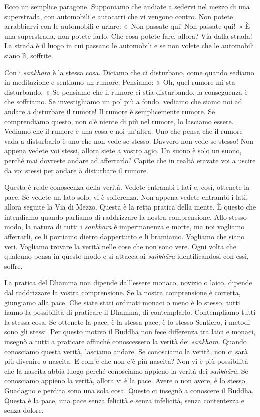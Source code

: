 Ecco un semplice paragone. Supponiamo che andiate a sedervi nel mezzo di
una superstrada, con automobili e autocarri che vi vengono contro. Non
potete arrabbiarvi con le automobili e urlare: «~Non passate qui! Non
passate qui!~» È una superstrada, non potete farlo. Che cosa potete
fare, allora? Via dalla strada! La strada è il luogo in cui passano le
automobili e se non volete che le automobili siano lì, soffrite.

Con i \emph{saṅkhāra} è la stessa cosa. Diciamo che ci disturbano, come
quando sediamo in meditazione e sentiamo un rumore. Pensiamo: «~Oh, quel
rumore mi sta disturbando.~» Se pensiamo che il rumore ci stia
disturbando, la conseguenza è che soffriamo. Se investighiamo un po' più
a fondo, vediamo che siamo noi ad andare a disturbare il rumore! Il
rumore è semplicemente rumore. Se comprendiamo questo, non c'è niente di
più nel rumore, lo lasciamo essere. Vediamo che il rumore è una cosa e
noi un'altra. Uno che pensa che il rumore vada a disturbarlo è uno che
non vede se stesso. Davvero non vede se stesso! Non appena vedete voi
stessi, allora siete a vostro agio. Un suono è solo un suono, perché mai
dovreste andare ad afferrarlo? Capite che in realtà eravate voi a uscire
da voi stessi per andare a disturbare il rumore.

Questa è reale conoscenza della verità. Vedete entrambi i lati e, così,
ottenete la pace. Se vedete un lato solo, vi è sofferenza. Non appena
vedete entrambi i lati, allora seguite la Via di Mezzo. Questa è la
retta pratica della mente. È questo che intendiamo quando parliamo di
raddrizzare la nostra comprensione. Allo stesso modo, la natura di tutti
i \emph{saṅkhāra} è impermanenza e morte, ma noi vogliamo afferrarli, ce
li portiamo dietro dappertutto e li bramiamo. Vogliamo che siano veri.
Vogliamo trovare la verità nelle cose che non sono vere. Ogni volta che
qualcuno pensa in questo modo e si attacca ai \emph{saṅkhāra}
identificandosi con essi, soffre.

La pratica del Dhamma non dipende dall'essere monaco, novizio o laico,
dipende dal raddrizzare la vostra comprensione. Se la nostra
comprensione è corretta, giungiamo alla pace. Che siate stati ordinati
monaci o meno è lo stesso, tutti hanno la possibilità di praticare il
Dhamma, di contemplarlo. Contempliamo tutti la stessa cosa. Se ottenete
la pace, è la stessa pace; è lo stesso Sentiero, i metodi sono gli
stessi. Per questo motivo il Buddha non fece differenza tra laici e
monaci, insegnò a tutti a praticare affinché conoscessero la verità dei
\emph{saṅkhāra}. Quando conosciamo questa verità, lasciamo andare. Se
conosciamo la verità, non ci sarà più divenire o nascita. E com'è che
non c'è più nascita? Non vi è più possibilità che la nascita abbia luogo
perché conosciamo appieno la verità dei \emph{saṅkhāra}. Se conosciamo
appieno la verità, allora vi è la pace. Avere o non avere, è lo stesso.
Guadagno e perdita sono una sola cosa. Questo ci insegnò a conoscere il
Buddha. Questa è la pace, una pace senza felicità e senza infelicità,
senza contentezza e senza dolore.

